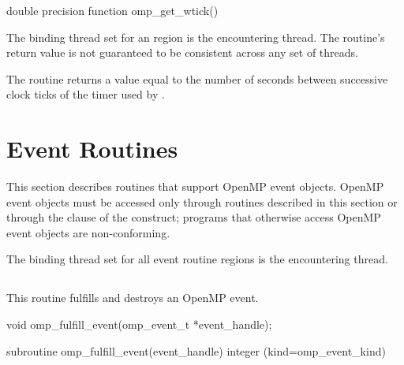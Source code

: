 \begin{fortranspecific}
\begin{ompfFunction}
double precision function omp_get_wtick()
\end{ompfFunction}
\end{fortranspecific}

\binding
The binding thread set for an  region is the encountering thread. The
routine's return value is not guaranteed to be consistent across any set of threads.

\effect
The  routine returns a value equal to the number of seconds between
successive clock ticks of the timer used by .

\section{Event Routines}
\label{sec:Event Routines}

This section describes routines that support OpenMP event objects. OpenMP event objects must be accessed only through routines described in this section or through the  clause of the  construct; programs that otherwise access OpenMP event objects are non-conforming.

\binding

The binding thread set for all event routine regions is the encountering thread.

\subsection{}
\label{subsec:omp_fulfill_event}
\summary
This routine fulfills and destroys an OpenMP event.

\format
\begin{ccppspecific}
\begin{ompcFunction}
void omp_fulfill_event(omp_event_t *event_handle);
\end{ompcFunction}
\end{ccppspecific}

\begin{fortranspecific}
\begin{ompfFunction}
subroutine omp_fulfill_event(event_handle)
integer (kind=omp_event_kind) 
\end{ompfFunction}
\end{fortranspecific}

